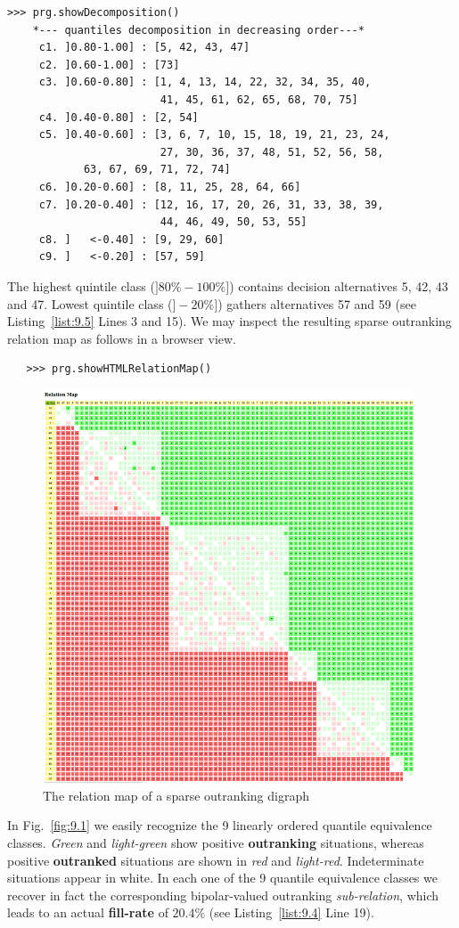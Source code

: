 \begin{lstlisting}[caption={The quantiles decomposition of a pre-ranked outranking digraph},label=list:9.5]
>>> prg.showDecomposition()
    *--- quantiles decomposition in decreasing order---*
     c1. ]0.80-1.00] : [5, 42, 43, 47]
     c2. ]0.60-1.00] : [73]
     c3. ]0.60-0.80] : [1, 4, 13, 14, 22, 32, 34, 35, 40,
                        41, 45, 61, 62, 65, 68, 70, 75]
     c4. ]0.40-0.80] : [2, 54]
     c5. ]0.40-0.60] : [3, 6, 7, 10, 15, 18, 19, 21, 23, 24,
                        27, 30, 36, 37, 48, 51, 52, 56, 58,
			63, 67, 69, 71, 72, 74]
     c6. ]0.20-0.60] : [8, 11, 25, 28, 64, 66]
     c7. ]0.20-0.40] : [12, 16, 17, 20, 26, 31, 33, 38, 39,
                        44, 46, 49, 50, 53, 55]
     c8. ]   <-0.40] : [9, 29, 60]
     c9. ]   <-0.20] : [57, 59]
\end{lstlisting}

The highest quintile class ($]80\%-100\%]$) contains decision alternatives 5, 42, 43 and 47. Lowest quintile class ($]-20\%]$) gathers alternatives 57 and 59 (see Listing~\vref{list:9.5} Lines 3 and 15). We may inspect the resulting sparse outranking relation map as follows in a browser view.
\begin{lstlisting}
   >>> prg.showHTMLRelationMap()
\end{lstlisting}
\begin{figure}[h]
\includegraphics[width=11cm]{Figures/9-1-sparse75RelationMap.png}
\caption{The relation map of a sparse outranking digraph}
\label{fig:9.1}       %
\end{figure}
In Fig.~\vref{fig:9.1} we easily recognize the 9 linearly ordered quantile equivalence classes. \emph{Green} and \emph{light-green} show positive \textbf{outranking} situations, whereas positive \textbf{outranked} situations are shown in \emph{red} and \emph{light-red}. Indeterminate situations appear in white. In each one of the 9 quantile equivalence classes we recover in fact the corresponding bipolar-valued outranking \emph{sub-relation}, which leads to an actual \textbf{fill-rate} of $20.4\%$ (see Listing~\vref{list:9.4} Line 19).


